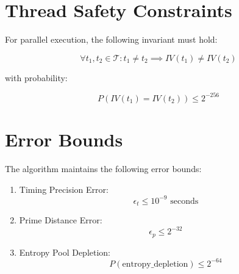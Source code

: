 \documentclass{article}
\begin{document}
\section{Thread Safety Constraints}

For parallel execution, the following invariant must hold:

\[
\forall t_1, t_2 \in \mathcal{T}: t_1 \neq t_2 \implies IV(t_1) \neq IV(t_2)
\]

with probability:

\[
P(IV(t_1) = IV(t_2)) \leq 2^{-256}
\]

\section{Error Bounds}

The algorithm maintains the following error bounds:

\begin{enumerate}
  \item Timing Precision Error:
  \[
  \epsilon_t \leq 10^{-9} \text{ seconds}
  \]
  \item Prime Distance Error:
  \[
  \epsilon_p \leq 2^{-32}
  \]
  \item Entropy Pool Depletion:
  \[
  P(\text{entropy\_depletion}) \leq 2^{-64}
  \]
\end{enumerate}
\end{document}
